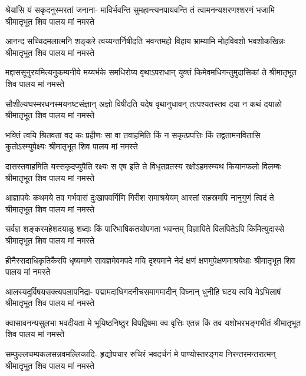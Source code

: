 

\fourlineindentedshloka
{श्रेयांसि यं सकृदनुस्मरतां जनाना-}
{माविर्भवन्ति सुमहान्त्यनपायवन्ति}
{तं त्वामनन्यशरणश्शरणं भजामि}
{श्रीमातृभूत शिव पालय मां नमस्ते} %

\fourlineindentedshloka
{आनन्द सच्चिदमलात्मनि शङ्करे}
{त्वय्यन्तर्निषीदति भवन्तमहो विहाय}
{भ्राम्यामि मोहविवशो भवशोकखिन्नः}
{श्रीमातृभूत शिव पालय मां नमस्ते} %

\fourlineindentedshloka
{मद्दाससूनुरयमित्यनुकम्पनीये}
{मय्यर्भके समधिरोप्य वृथाऽपराधान्}
{युक्तं किमेवमधिगन्तुमुदासिकां ते}
{श्रीमातृभूत शिव पालय मां नमस्ते} %

\fourlineindentedshloka
{सौशील्यघस्मरधनस्मयनष्टसंज्ञान्}
{अज्ञो विषीदति यदेष वृथानुधावन्}
{तत्पश्यतस्तव दया न कथं दयाळो}
{श्रीमातृभूत शिव पालय मां नमस्ते} %

\fourlineindentedshloka
{भक्तिं त्वयि श्रितवतां वद कः प्रहीणः}
{सा वा तवाहमिति किं न सकृत्प्रपत्तिः}
{किं तद्वतामनवितासि कुतोऽस्म्युपेक्ष्यः}
{श्रीमातृभूत शिव पालय मां नमस्ते} %

\fourlineindentedshloka
{दासस्तवाहमिति यस्सकृदप्युपैति}
{रक्ष्यः स एष इति ते विधृतव्रतस्य}
{रक्षोऽहमस्म्यथ कियानफलो विलम्बः}
{श्रीमातृभूत शिव पालय मां नमस्ते} %

\fourlineindentedshloka
{आज्ञापयेः कथमये तव गर्भवासं}
{दुःखापवर्गिणि गिरीश समाश्रयेयम्}
{आस्तां सहस्रमपि नानुगुणं त्विदं ते}
{श्रीमातृभूत शिव पालय मां नमस्ते} %

\fourlineindentedshloka
{सर्वज्ञ शङ्करमहेशदयाळु शब्दाः}
{किं पारिभाषिकतयोपगता भवन्तम्}
{विज्ञापिते विलपितेऽपि किमित्युदास्से}
{श्रीमातृभूत शिव पालय मां नमस्ते} %

\fourlineindentedshloka
{हीनैस्सदाधिकृतिकैरपि धृष्यमाणे}
{सावज्ञमेवमपदे मयि दृश्यमाने}
{नेदं क्षणं क्षणमुपेक्षणमाश्रयेथाः}
{श्रीमातृभूत शिव पालय मां नमस्ते} %

\fourlineindentedshloka
{आलस्यदुर्विषयसक्त्यपलापनिद्रा-}
{पद्मामदाधिगदनीचसमागमादीन्}
{विघ्नान् धुनीहि घटय त्वयि मेऽभिलाषं}
{श्रीमातृभूत शिव पालय मां नमस्ते} %

\fourlineindentedshloka
{क्वासावनन्यसुलभा भवदीयता मे}
{भूयिष्ठनिष्ठुर विपद्विषमा क्व वृत्तिः}
{एतन्न किं तव यशोभरभङ्गभीतं}
{श्रीमातृभूत शिव पालय मां नमस्ते} %

\fourlineindentedshloka
{सम्फुल्लचम्पकलसन्नवमल्लिकादि-}
{हृद्योपचार रुचिरं भवदर्चनं मे}
{पाण्योस्तरङ्गय निरन्तरमन्तरात्मन्}
{श्रीमातृभूत शिव पालय मां नमस्ते} %

